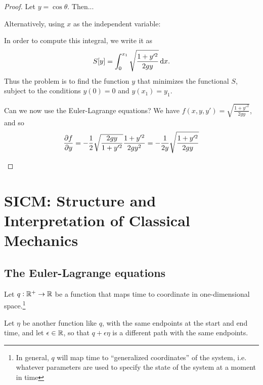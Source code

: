 \begin{proof}
  Let $y = \cos \theta$. Then...


  Alternatively, using $x$ as the independent variable:
  \begin{mdframed}
    In order to compute this integral, we write it as
    \begin{align*}
    S[y] = \int_{0}^{x_1} \sqrt{\frac{1 + y'^2}{2gy}}\dx.
  \end{align*}
  Thus the problem is to find the function $y$ that minimizes the functional
  $S$, subject to the conditions $y(0) = 0$ and $y(x_1) = y_1$.

  Can we now use the Euler-Lagrange equations? We have $f(x, y, y') = \sqrt{\frac{1 + y'^2}{2gy}}$, and so
  \begin{align*}
    \frac{\partial f}{\partial y} = -\frac{1}{2}\sqrt{\frac{2gy}{1 + y'^2}}\frac{1 + y'^2}{2gy^2} = -\frac{1}{2y}\sqrt{\frac{1 + y'^2}{2gy}}
  \end{align*}
\end{mdframed}

\end{proof}


\section{SICM: Structure and Interpretation of Classical Mechanics}

\subsection{The Euler-Lagrange equations}

Let $q:\mathbb{R}^+ \to \mathbb{R}$ be a function that maps time to coordinate in one-dimensional space.\footnote{In
  general, $q$ will map time to ``generalized coordinates'' of the system, i.e. whatever parameters
  are used to specify the state of the system at a moment in time}

Let $\eta$ be another function like $q$, with the same endpoints at the start and end time, and let
$\epsilon \in \mathbb{R}$, so that $q + \epsilon\eta$ is a different path with the same endpoints.


